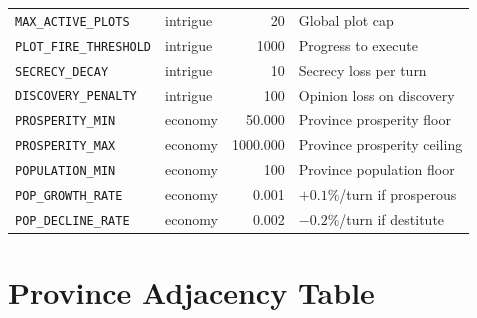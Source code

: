 \documentclass[a4paper, 11pt]{article}
\begin{document}
\begin{longtable}{@{}llrl@{}}
\texttt{MAX\_ACTIVE\_PLOTS}       & intrigue & 20    & Global plot cap \\
\texttt{PLOT\_FIRE\_THRESHOLD}    & intrigue & 1000  & Progress to execute \\
\texttt{SECRECY\_DECAY}           & intrigue & 10    & Secrecy loss per turn \\
\texttt{DISCOVERY\_PENALTY}       & intrigue & 100   & Opinion loss on discovery \\
\texttt{PROSPERITY\_MIN}          & economy  & 50.000 & Province prosperity floor \\
\texttt{PROSPERITY\_MAX}          & economy  & 1000.000 & Province prosperity ceiling \\
\texttt{POPULATION\_MIN}          & economy  & 100   & Province population floor \\
\texttt{POP\_GROWTH\_RATE}        & economy  & 0.001 & $+0.1\%$/turn if prosperous \\
\texttt{POP\_DECLINE\_RATE}       & economy  & 0.002 & $-0.2\%$/turn if destitute \\
\end{longtable}


\section{Province Adjacency Table}
\label{app:adjacency}
\end{document}
